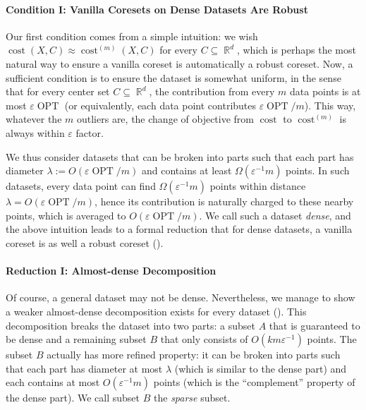 \documentclass[letterpaper,11pt]{article}
\theoremstyle{plain}
\theoremstyle{definition}
\theoremstyle{remark}
\DeclareMathOperator{\R}{\mathbb{R}}
\DeclareMathOperator{\cost}{cost}
\DeclareMathOperator{\OPT}{OPT}
\newcommand{\eps}{\varepsilon}
\renewcommand{\epsilon}{\varepsilon}
\begin{document}
\paragraph{Condition I: Vanilla Coresets on Dense Datasets Are Robust}
Our first condition comes from a simple intuition:
we wish $\cost(X, C) \approx \cost^{(m)}(X, C)$ for every $C \subseteq \R^d$, 
which is perhaps the most natural way to ensure a vanilla coreset is automatically a robust coreset.
Now, a sufficient condition is to ensure the dataset is somewhat uniform, in the sense that for every center set $C \subseteq \R^d$, the contribution from every $m$ data points
is at most $\epsilon \OPT$ (or equivalently, each data point contributes $\epsilon \OPT / m$).
This way, whatever the $m$ outliers are, the change of objective from $\cost$ to $\cost^{(m)}$ is always within $\epsilon$ factor.

We thus consider datasets that can be broken into parts
such that each part has diameter $\lambda := O(\epsilon \OPT / m)$ and contains at least $\Omega(\epsilon^{-1} m)$ points.
In such datasets, every data point can find $\Omega(\epsilon^{-1}m)$ points within distance $\lambda = O(\epsilon \OPT / m) $,
hence its contribution is naturally charged to these nearby points, which is averaged to $O(\epsilon \OPT / m)$.
We call such a dataset \emph{dense},
and the above intuition leads to a formal reduction that for dense datasets, a vanilla coreset is as well a robust coreset ().




\paragraph{Reduction I: Almost-dense Decomposition}
Of course, a general dataset may not be dense.
Nevertheless, we manage to show a weaker almost-dense decomposition exists for every dataset ().
This decomposition breaks the dataset into two parts:
a subset $A$ that is guaranteed to be dense
and a remaining subset $B$ that only consists of $O(km\eps^{-1})$ points.
The subset $B$ actually has more refined property:
it can be broken into parts such that each part has diameter at most $\lambda$ (which is similar to the dense part)
and each contains at most $O(\epsilon^{-1}m)$ points (which is the ``complement'' property of the dense part).
We call subset $B$ the \emph{sparse} subset.
\end{document}
